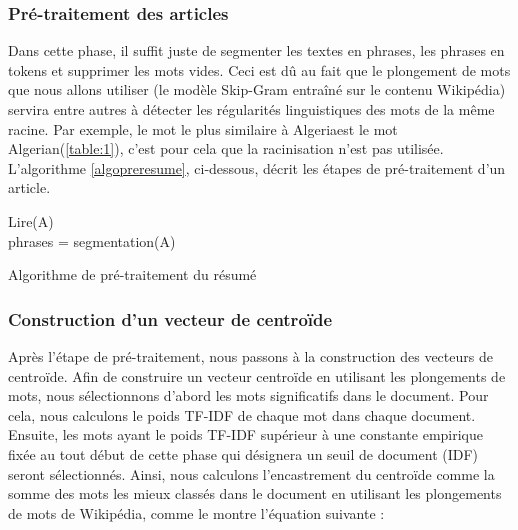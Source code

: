         \subsubsection{Pré-traitement des articles}
        Dans cette phase, il suffit juste de segmenter les textes en phrases, les phrases en tokens et supprimer les mots vides. Ceci est dû au fait que le plongement de mots que nous allons utiliser (le modèle Skip-Gram entraîné sur le contenu Wikipédia) servira entre autres à détecter les régularités linguistiques des  mots de la même racine. Par exemple, le mot le plus similaire à \textquotedbl Algeria\textquotedbl est le mot \textquotedbl Algerian\textquotedbl (\autoref{table:1}), c'est pour cela que la racinisation n'est pas utilisée. L'algorithme \autoref{algopreresume}, ci-dessous, décrit les étapes de pré-traitement d'un article.

         \begin{algorithm2e}[H]
          \SetAlgoLined
          Lire(A)\\
          phrases = segmentation(A)\\
         \caption{Algorithme de pré-traitement du résumé}
         \label{algopreresume}
        \end{algorithm2e}

       \subsubsection{Construction d'un vecteur de centroïde}
        Après l'étape de pré-traitement, nous passons à la construction des vecteurs de centroïde. Afin de construire un vecteur centroïde en utilisant les plongements de mots, nous sélectionnons d'abord les mots significatifs dans le document. Pour cela, nous calculons le poids TF-IDF de chaque mot dans chaque document. Ensuite, les mots ayant le poids TF-IDF supérieur à une constante empirique fixée au tout début de cette phase qui désignera un seuil de document (IDF) seront sélectionnés. Ainsi, nous calculons l'encastrement du centroïde comme la somme des mots les mieux classés dans le document en utilisant les plongements de mots de Wikipédia, comme le montre l'équation suivante :

